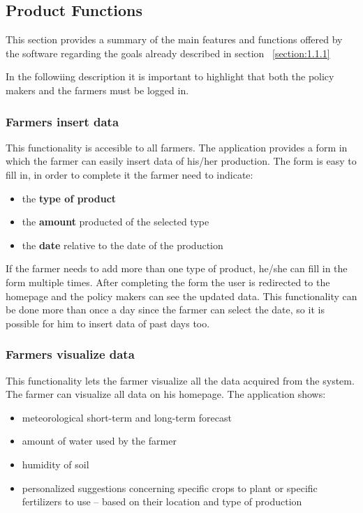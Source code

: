 \documentclass{article}
\begin{document}
\subsection{Product Functions}
This section provides a summary of the main features and 
functions offered by the software regarding
the goals already described in section ~\ref{section:1.1.1}

In the followiing description it is important to highlight that both
the policy makers and the farmers must be logged in.

\subsubsection{Farmers insert data} 
This functionality is accesible to all farmers. 
The application provides a form in which the farmer can easily insert data of his/her production.
The form is easy to fill in, in order to complete it the farmer need to indicate:
\begin{itemize}
    \item the \textbf{type of product}
    \item the \textbf{amount} producted of the selected type
    \item the \textbf{date} relative to the date of the production
\end{itemize}
If the farmer needs to add more than one type of product, 
he/she can fill in the form multiple times.
After completing the form the user is redirected to the homepage and the policy makers 
can see the updated data.
This functionality can be done more than once a day since the farmer can select the date, 
so it is possible for him to insert data of past days too.



\subsubsection{Farmers visualize data}
This functionality lets the farmer visualize all the data 
acquired from the system. The farmer can visualize all data on his homepage.\newline
The application shows:
\begin{itemize}
    \item meteorological  short-term and long-term forecast
    \item amount of water used by the farmer
    \item humidity of soil 
    \item personalized suggestions concerning specific crops to plant or specific 
    fertilizers to use – based on their location and type of production
\end{itemize}
\end{document}
